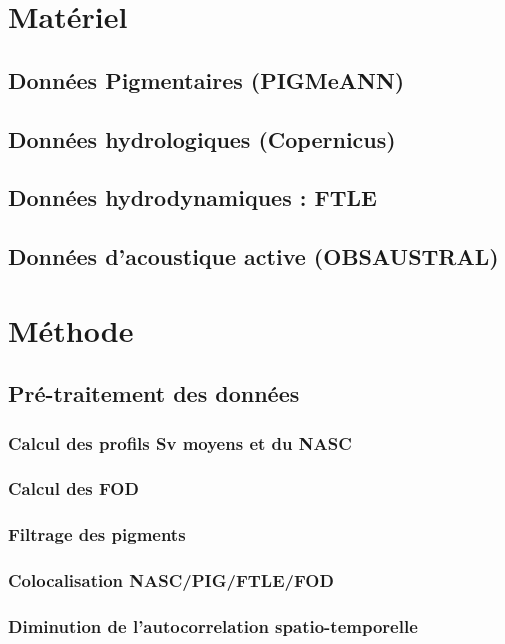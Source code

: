 \documentclass{article}
\begin{document}
	
	
	
	
	\section{Matériel}
	\subsection{Données Pigmentaires (PIGMeANN)}
	\subsection{Données hydrologiques (Copernicus)}
	\subsection{Données hydrodynamiques : FTLE}
	\subsection{Données d'acoustique active (OBSAUSTRAL)}
	
	\section{Méthode}
	\subsection{Pré-traitement des données}
	\subsubsection{Calcul des profils Sv moyens et du NASC}
	\subsubsection{Calcul des FOD}
	\subsubsection{Filtrage des pigments}
	\subsubsection{Colocalisation NASC/PIG/FTLE/FOD}
	\subsubsection{Diminution de l'autocorrelation spatio-temporelle}
	
\end{document}
